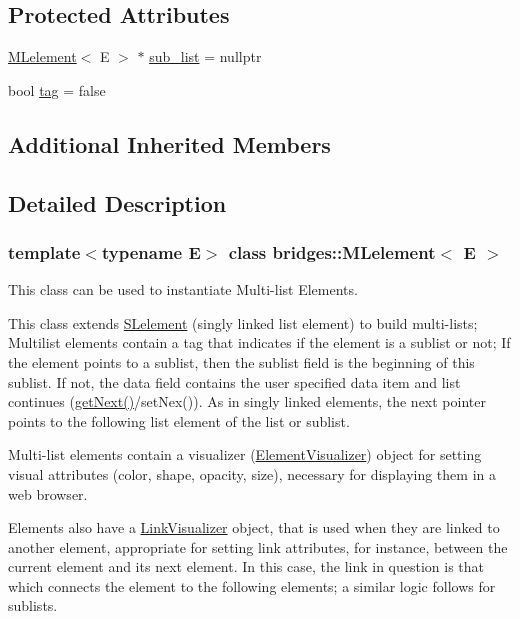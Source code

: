 \subsection*{Protected Attributes}
\begin{DoxyCompactItemize}
\item 
\mbox{\hyperlink{classbridges_1_1_m_lelement}{M\+Lelement}}$<$ E $>$ $\ast$ \mbox{\hyperlink{classbridges_1_1_m_lelement_aa664b4e694c08e5cc31cc9d317dda100}{sub\+\_\+list}} = nullptr
\item 
bool \mbox{\hyperlink{classbridges_1_1_m_lelement_a0285a07355b2bc3d064c30e20aa2fd55}{tag}} = false
\end{DoxyCompactItemize}
\subsection*{Additional Inherited Members}


\subsection{Detailed Description}
\subsubsection*{template$<$typename E$>$\newline
class bridges\+::\+M\+Lelement$<$ E $>$}

This class can be used to instantiate Multi-\/list Elements. 

This class extends \mbox{\hyperlink{classbridges_1_1_s_lelement}{S\+Lelement}} (singly linked list element) to build multi-\/lists; Multilist elements contain a tag that indicates if the element is a sublist or not; If the element points to a sublist, then the sublist field is the beginning of this sublist. If not, the data field contains the user specified data item and list continues (\mbox{\hyperlink{classbridges_1_1_m_lelement_aceebd292e7d497f44eea5c4845e7709f}{get\+Next()}}/set\+Nex()). As in singly linked elements, the next pointer points to the following list element of the list or sublist.

Multi-\/list elements contain a visualizer (\mbox{\hyperlink{classbridges_1_1_element_visualizer}{Element\+Visualizer}}) object for setting visual attributes (color, shape, opacity, size), necessary for displaying them in a web browser.

Elements also have a \mbox{\hyperlink{classbridges_1_1_link_visualizer}{Link\+Visualizer}} object, that is used when they are linked to another element, appropriate for setting link attributes, for instance, between the current element and its next element. In this case, the link in question is that which connects the element to the following elements; a similar logic follows for sublists.

